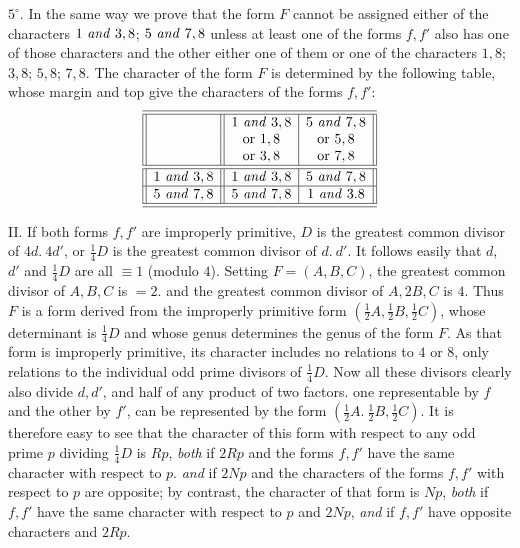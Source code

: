 $5^{\circ}$. In the same way we prove that the form $F$ cannot be assigned either of the characters $1\text{ \textit{and} }3,8$; $5\text{ \textit{and} }7,8$ unless at least one of the forms $f,f'$ also has one of those characters and the other either one of them or one of the characters $1,8$; $3,8$; $5,8$; $7,8$.
The character of the form $F$ is determined by the following table, whose margin and top give the characters of the forms $f,f'$:
\[
\begin{array}{||c||c|c||}
\hline\hline
 & 1\text{ \textit{and} }3,8 & 5\text{ \textit{and} }7,8 \\
 & \text{or }1,8 & \text{or }5,8 \\
 & \text{or }3,8 & \text{or }7,8 \\
\hline\hline
1\text{ \textit{and} }3,8 & 1\text{ \textit{and} }3,8 & 5\text{ \textit{and} }7,8 \\
\hline
5\text{ \textit{and} }7,8 & 5\text{ \textit{and} }7,8 & 1\text{ \textit{and} }3.8 \\
\hline\hline
\end{array}
\]

II. If both forms $f,f'$ are improperly primitive, $D$ is the greatest common divisor of $4d.\ 4d'$, or $\frac{1}{4}D$ is the greatest common divisor of $d.\ d'$. It follows easily that $d$, $d'$ and $\frac{1}{4}D$ are all $\equiv1$ (modulo $4$). Setting $F=(A,B,C)$, the greatest common divisor of $A,B,C$ is $=2$. and the greatest common divisor of $A,2B,C$ is $4$. Thus $F$ is a form derived from the improperly primitive form $(\frac{1}{2}A,\frac{1}{2}B,\frac{1}{2}C)$, whose determinant is $\frac{1}{4}D$ and whose genus determines the genus of the form $F$. As that form is improperly primitive, its character includes no relations to $4$ or $8$, only relations to the individual odd prime divisors of $\frac{1}{4}D$. Now all these divisors clearly also divide $d,d'$, and half of any product of two factors. one representable by $f$ and the other by $f'$, can be represented by the form $(\frac{1}{2}A.\ \frac{1}{2}B,\frac{1}{2}C)$. It is therefore easy to see that the character of this form with respect to any odd prime $p$ dividing $\frac{1}{4}D$ is $Rp$, \textit{both} if $2Rp$ and the forms $f,f'$ have the same character with respect to $p$. \textit{and} if $2Np$ and the characters of the forms $f,f'$ with respect to $p$ are opposite; by contrast, the character of that form is $Np$, \textit{both} if $f,f'$ have the same character with respect to $p$ and $2Np$, \textit{and} if $f,f'$ have opposite characters and $2Rp$.

